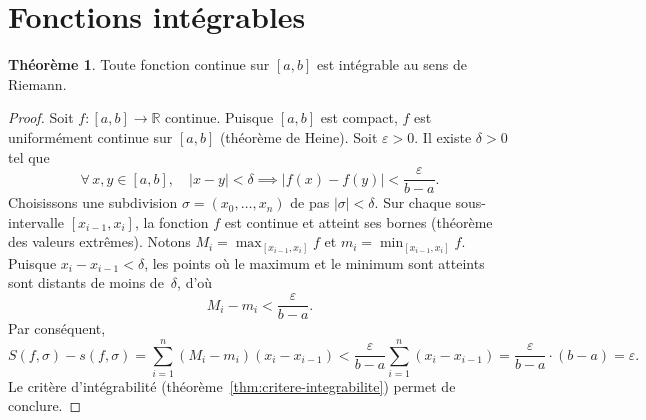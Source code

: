 \documentclass[12pt,a4paper,openany]{book}
\theoremstyle{definition}
\newtheorem{theoreme}{Théorème}[chapter]
\newcommand{\R}{\mathbb{R}}
\newcommand{\eps}{\varepsilon}
\newcommand{\abs}[1]{\left\lvert #1 \right\rvert}
\begin{document}
\begin{center}
\end{center}

\section{Fonctions intégrables}
\label{sec:fonctions-integrables}

\begin{theoreme}\label{thm:continue-integrable}
  Toute fonction continue sur $[a,b]$ est intégrable au sens de Riemann.
\end{theoreme}

\begin{proof}
  Soit $f \colon [a,b] \to \R$ continue. Puisque $[a,b]$ est compact, $f$ est uniformément continue sur $[a,b]$ (théorème de Heine). Soit $\eps > 0$. Il existe $\delta > 0$ tel que
  \[
    \forall\, x, y \in [a,b], \quad \abs{x - y} < \delta \implies \abs{f(x) - f(y)} < \frac{\eps}{b - a}.
  \]
  Choisissons une subdivision $\sigma = (x_0, \ldots, x_n)$ de pas $\abs{\sigma} < \delta$. Sur chaque sous-intervalle $[x_{i-1}, x_i]$, la fonction $f$ est continue et atteint ses bornes (théorème des valeurs extrêmes). Notons $M_i = \max_{[x_{i-1},x_i]} f$ et $m_i = \min_{[x_{i-1},x_i]} f$. Puisque $x_i - x_{i-1} < \delta$, les points où le maximum et le minimum sont atteints sont distants de moins de~$\delta$, d'où
  \[
    M_i - m_i < \frac{\eps}{b - a}.
  \]
  Par conséquent,
  \[
    S(f, \sigma) - s(f, \sigma) = \sum_{i=1}^{n}(M_i - m_i)(x_i - x_{i-1})
    < \frac{\eps}{b-a} \sum_{i=1}^{n}(x_i - x_{i-1}) = \frac{\eps}{b-a} \cdot (b - a) = \eps.
  \]
  Le critère d'intégrabilité (théorème~\ref{thm:critere-integrabilite}) permet de conclure.
\end{proof}
\end{document}
